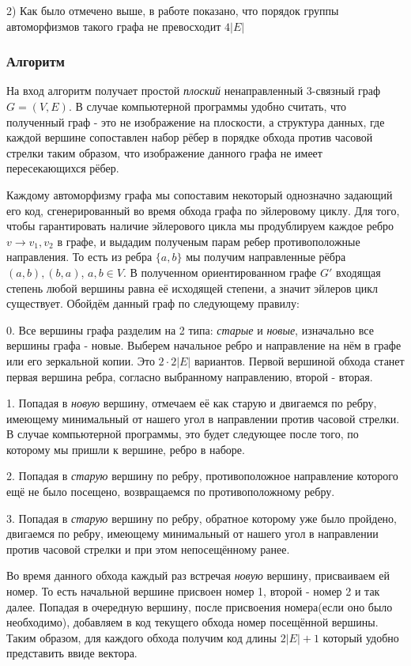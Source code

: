 2) Как было отмечено выше, в работе \cite{4} показано, что порядок группы автоморфизмов такого графа не превосходит $4|E|$

\subsubsection*{Алгоритм}
На вход алгоритм получает простой \textit{плоский} ненаправленный 3-связный граф $G=(V, E)$. В случае компьютерной программы удобно считать, что полученный граф - это не изображение на плоскости, а структура данных, где каждой вершине сопоставлен набор рёбер в порядке обхода против часовой стрелки таким образом, что изображение данного графа не имеет пересекающихся рёбер. 

Каждому автоморфизму графа мы сопоставим некоторый однозначно задающий его код, сгенерированный во время обхода графа по эйлеровому циклу. Для того, чтобы гарантировать наличие эйлерового цикла мы продублируем каждое ребро $v \rightarrow v_1, v_2$ в графе, и выдадим полученым парам ребер противоположные направления. То есть из ребра $\{a, b\}$ мы получим направленные рёбра $(a, b), (b, a)$, $a, b \in V$. В полученном ориентированном графе $G'$ входящая степень любой вершины равна её исходящей степени, а значит эйлеров цикл существует. Обойдём данный граф по следующему правилу:

    0. Все вершины графа разделим на 2 типа: \textit{старые} и \textit{новые}, изначально все вершины графа - новые. Выберем начальное ребро и направление на нём в графе или его зеркальной копии. Это $2 \cdot 2|E|$ вариантов. Первой вершиной обхода станет первая вершина ребра, согласно выбранному направлению, второй - вторая.
    
    1. Попадая в \textit{новую} вершину, отмечаем её как старую и двигаемся по ребру, имеющему минимальный от нашего угол в направлении против часовой стрелки. В случае компьютерной программы, это будет следующее после того, по которому мы пришли к вершине, ребро в наборе.

    2. Попадая в \textit{старую} вершину по ребру, противоположное направление которого ещё не было посещено, возвращаемся по противоположному ребру.

    3. Попадая в \textit{старую} вершину по ребру, обратное которому уже было пройдено, двигаемся по ребру, имеющему минимальный от нашего угол в направлении против часовой стрелки и при этом непосещённому ранее.

Во время данного обхода каждый раз встречая \textit{новую} вершину, присваиваем ей номер. То есть начальной вершине присвоен номер 1, второй - номер 2 и так далее. Попадая в очередную вершину, после присвоения номера(если оно было необходимо), добавляем в код текущего обхода номер посещённой вершины. Таким образом, для каждого обхода получим код длины $2|E| + 1$ который удобно представить ввиде вектора.

